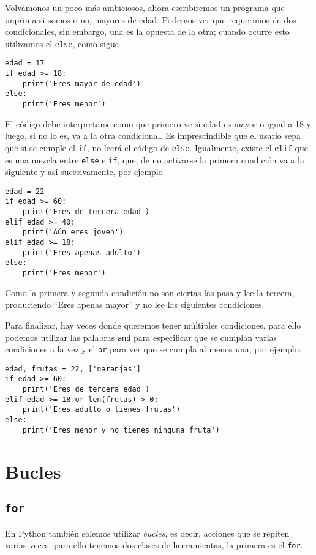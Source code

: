 \documentclass[11pt,twoside]{report}
\begin{document}
Volvámonos un poco más ambiciosos, ahora escribiremos un programa que imprima si somos o no, mayores de edad. Podemos ver que requerimos de dos condicionales, sin embargo, una es la opuesta de la otra; cuando ocurre esto utilizamos el \lstinline|else|, como sigue
\begin{lstlisting}
edad = 17
if edad >= 18:
    print('Eres mayor de edad')
else:
    print('Eres menor')
\end{lstlisting}
El código debe interpretarse como que primero ve si edad es mayor o igual a 18 y luego, si no lo es, va a la otra condicional. Es imprescindible que el usario sepa que si se cumple el \lstinline|if|, no leerá el código de \lstinline|else|. Igualmente, existe el \lstinline|elif| que es una mezcla entre \lstinline|else| e \lstinline|if|, que, de no activarse la primera condición va a la siguiente y así sucesivamente, por ejemplo
\begin{lstlisting}
edad = 22
if edad >= 60:
    print('Eres de tercera edad')
elif edad >= 40:
    print('Aún eres joven')
elif edad >= 18:
    print('Eres apenas adulto')
else:
    print('Eres menor')
\end{lstlisting}
Como la primera y segunda condición no son ciertas las pasa y lee la tercera, produciendo ``Eres apenas mayor'' y no lee las siguientes condiciones.

Para finalizar, hay veces donde queremos tener múltiples condiciones, para ello podemos utilizar las palabras \lstinline|and| para especificar que se cumplan varias condiciones a la vez y el \lstinline|or| para ver que se cumpla al menos una, por ejemplo:
\begin{lstlisting}
edad, frutas = 22, ['naranjas']
if edad >= 60:
    print('Eres de tercera edad')
elif edad >= 18 or len(frutas) > 0:
    print('Eres adulto o tienes frutas')
else:
    print('Eres menor y no tienes ninguna fruta')
\end{lstlisting}

\section{Bucles}
\subsection{\texttt{for}}
En Python también solemos utilizar \textit{bucles}, es decir, acciones que se repiten varias veces; para ello tenemos dos clases de herramientas, la primera es el \lstinline|for|.
\end{document}
